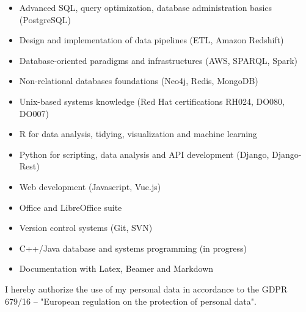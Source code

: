 \documentclass[10pt, a4paper, roman]{moderncv}        %
\begin{document}
	\begin{itemize}
		
		\item Advanced SQL, query optimization, database administration basics (PostgreSQL)
		
		\vspace{1pt}
		
		\item Design and implementation of data pipelines (ETL, Amazon Redshift)
		
		\vspace{1pt}
		
		\item Database-oriented paradigms and infrastructures (AWS, SPARQL, Spark)
		
		\vspace{1pt}
		
		\item Non-relational databases foundations (Neo4j, Redis, MongoDB)
		
		\vspace{1pt}
		
		\item Unix-based systems knowledge (Red Hat certifications RH024, DO080, DO007)
		
		\vspace{1pt}
		
		\item R for data analysis, tidying, visualization and machine learning
		
		\vspace{1pt}
		
		\item Python for scripting, data analysis and API development (Django, Django-Rest)
		
		\vspace{1pt}
		
		\item Web development (Javascript, Vue.js)
		
		\vspace{1pt}
		
		\item Office and LibreOffice suite
		
		\vspace{1pt}
		
		\item Version control systems (Git, SVN)
		
		\vspace{1pt}
		
		\item C++/Java database and systems programming (in progress)
		
		\vspace{1pt}
		
		\item Documentation with Latex, Beamer and Markdown
		
	\end{itemize}
	
	\vspace{30pt}
	I hereby authorize the use of my personal data in accordance to the GDPR 679/16 – "European regulation on the protection of personal data".
	
\end{document}
